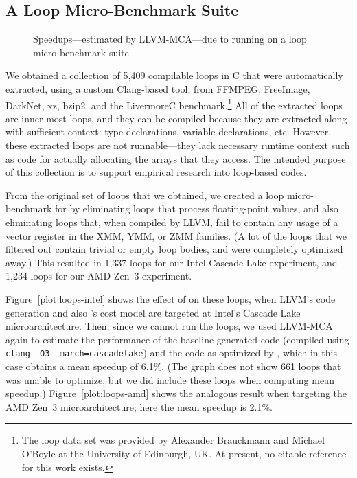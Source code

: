 \subsection{A Loop Micro-Benchmark Suite}
\label{sec:loops}


\begin{figure*}[tbp]
  \centering
  \hfill
  \caption{Speedups---estimated by LLVM-MCA---due to running \tool{}
    on a loop micro-benchmark suite}
\end{figure*}

We obtained a collection of 5,409 compilable loops in C that were
automatically extracted, using a custom Clang-based tool, from FFMPEG,
FreeImage, DarkNet, xz, bzip2, and the LivermoreC
benchmark.\footnote{The loop data set was provided by Alexander
Brauckmann and Michael O'Boyle at the University of Edinburgh, UK\@.
At present, no citable reference for this work exists.}
%
All of the extracted loops are inner-most loops, and they can be
compiled because they are extracted along with sufficient context:
type declarations, variable declarations, etc.
%
However, these extracted loops are not runnable---they lack necessary
runtime context such as code for actually allocating the arrays that
they access.
%
The intended purpose of this collection is to support empirical
research into loop-based codes.


From the original set of loops that we obtained, we created a loop
micro-benchmark for \tool{} by eliminating loops that process
floating-point values, and also eliminating loops that, when compiled
by LLVM, fail to contain any usage of a vector register in the XMM,
YMM, or ZMM families.
%
(A lot of the loops that we filtered out contain trivial or empty loop
bodies, and were completely optimized away.)
%
This resulted in 1,337 loops for our Intel Cascade Lake experiment,
and 1,234 loops for our AMD Zen~3 experiment.


Figure~\ref{plot:loops-intel} shows the effect of \tool{} on these
loops, when LLVM's code generation and also \tool's cost model are
targeted at Intel's Cascade Lake microarchitecture.
%
Then, since we cannot run the loops, we used LLVM-MCA again to
estimate the performance of the baseline generated code (compiled
using \texttt{clang -O3 -march=cascadelake}) and the code as optimized
by \tool, which in this case obtains a mean speedup of 6.1\%.
%
(The graph does not show 661 loops that \tool{} was unable to
optimize, but we did include these loops when computing mean speedup.)
%
Figure~\ref{plot:loops-amd} shows the analogous result when targeting
the AMD Zen~3 microarchitecture; here the mean speedup is 2.1\%.


